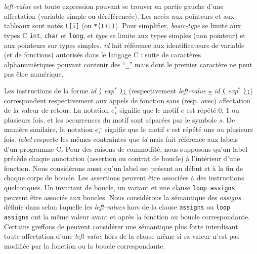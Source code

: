 \textit{left-value} est toute expression pouvant se trouver en
partie gauche d'une affectation (variable simple ou déréférencée).
Les accès aux pointeurs et aux tableaux sont notés \lstinline't[i]' (ou
\lstinline'*(t+i)').
Pour simplifier, \textit{basic-type} se limite aux types C \lstinline'int',
\lstinline'char' et \lstinline'long', et \textit{type} se limite aux types
simples (non pointeur) et aux pointeurs sur types simples.
\textit{id} fait référence aux identificateurs de variable (et de fonctions)
autorisés dans le langage C : suite de caractères alphanumériques pouvant
contenir des ``\lstinline'_''' mais dont le premier caractère ne peut pas être
numérique.

Les instructions de la forme \textit{id} \underline{\lstinline'('}
\textit{exp}$^{*}$ \underline{\lstinline');'} (respectivement
\textit{left-value} \underline{\lstinline'='} \textit{id}
\underline{\lstinline'('} \textit{exp}$^{*}$ \underline{\lstinline');'})
correspondent respectivement aux appels de fonction sans (resp. avec)
affectation de la valeur de retour.
La notation $e^*_s$ signifie que le motif $e$ est répété 0, 1 ou plusieurs fois,
et les occurrences du motif sont séparées par le symbole $s$.
De manière similaire, la notation $e^+_s$ signifie que le motif $e$ est répété
une ou plusieurs fois. 
\textit{label} respecte les mêmes contraintes que \textit{id} mais fait
référence aux labels d'un programme C.
Pour des raisons de commodité, nous supposons qu'un label précède chaque
annotation (assertion ou contrat de boucle) à l'intérieur d'une fonction.
Nous considérons aussi qu'un label est présent au début et à la fin de chaque
corps de boucle.
Les assertions peuvent être associées à des instructions quelconques.
Un invariant de boucle, un variant et une clause \lstinline'loop assigns'
peuvent être associés aux boucles.
Nous considérons la sémantique des \textit{assigns} définie dans \cite{ACSL}
selon laquelle les \textit{left-values} hors de la clause \lstinline'assigns' ou
\lstinline'loop assigns' ont la même valeur avant et après la fonction ou boucle
correspondante.
Certains greffons de \framac peuvent considérer une sémantique plus forte
interdisant toute affectation d'une \textit{left-value} hors de la clause même
si sa valeur n'est pas modifiée par la fonction ou la boucle correspondante.


